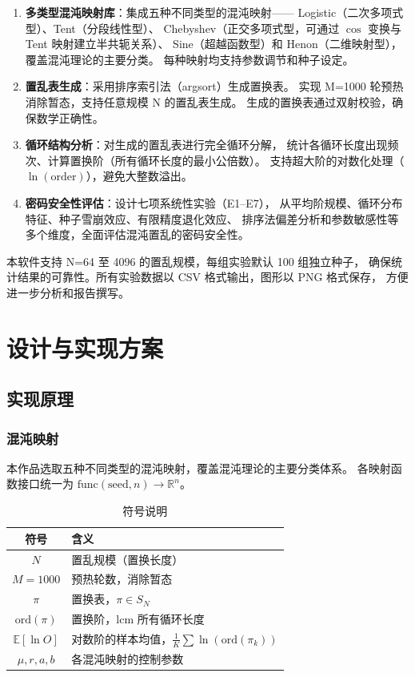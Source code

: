 \documentclass[12pt,a4paper]{ctexrep}
\begin{document}
\begin{enumerate}
  \item \textbf{多类型混沌映射库}：集成五种不同类型的混沌映射——
  Logistic（二次多项式型）、Tent（分段线性型）、  Chebyshev（正交多项式型，可通过 $\cos$ 变换与 Tent 映射建立半共轭关系）、
  Sine（超越函数型）和 Henon（二维映射型），覆盖混沌理论的主要分类。
  每种映射均支持参数调节和种子设定。

  \item \textbf{置乱表生成}：采用排序索引法（argsort）生成置换表。
  实现 M=1000 轮预热消除暂态，支持任意规模 N 的置乱表生成。
  生成的置换表通过双射校验，确保数学正确性。

  \item \textbf{循环结构分析}：对生成的置乱表进行完全循环分解，
  统计各循环长度出现频次、计算置换阶（所有循环长度的最小公倍数）。
  支持超大阶的对数化处理（$\ln(\text{order})$），避免大整数溢出。

  \item \textbf{密码安全性评估}：设计七项系统性实验（E1--E7），
  从平均阶规模、循环分布特征、种子雪崩效应、有限精度退化效应、
  排序法偏差分析和参数敏感性等多个维度，全面评估混沌置乱的密码安全性。
\end{enumerate}

本软件支持 N=64 至 4096 的置乱规模，每组实验默认 100 组独立种子，
确保统计结果的可靠性。所有实验数据以 CSV 格式输出，图形以 PNG 格式保存，
方便进一步分析和报告撰写。

\chapter{设计与实现方案}

\section{实现原理}

\subsection{混沌映射}

本作品选取五种不同类型的混沌映射，覆盖混沌理论的主要分类体系。
各映射函数接口统一为 $\text{func}(\text{seed}, n) \rightarrow \mathbb{R}^n$。

\begin{table}[H]
  \centering
  \caption{符号说明}
  \begin{tabular}{cl}
    \toprule
    符号 & 含义 \\
    \midrule
    $N$ & 置乱规模（置换长度） \\
    $M = 1000$ & 预热轮数，消除暂态 \\
    $\pi$ & 置换表，$\pi \in S_N$ \\
    $\mathrm{ord}(\pi)$ & 置换阶，$\mathrm{lcm}$ 所有循环长度 \\
    $\mathbb{E}[\ln O]$ & 对数阶的样本均值，$\frac{1}{K}\sum\ln(\mathrm{ord}(\pi_k))$ \\
    $\mu, r, a, b$ & 各混沌映射的控制参数 \\
    \bottomrule
  \end{tabular}
\end{table}
\end{document}
